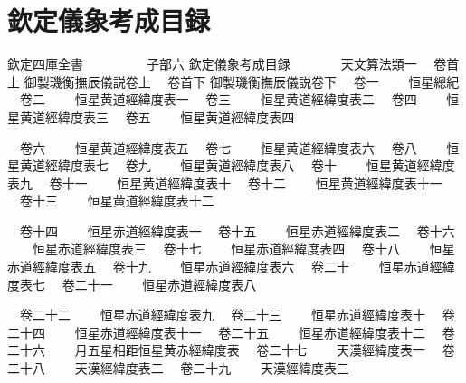 \chapter*{欽定儀象考成目録}
\begin{正文}
欽定四庫全書　　　　　子部六
欽定儀象考成目録　　　　天文算法類一
　卷首上
御製璣衡撫辰儀説卷上
　卷首下
御製璣衡撫辰儀説卷下
　卷一
　　恒星總紀
　卷二
　　恒星黄道經緯度表一
　卷三
　　恒星黄道經緯度表二
　卷四
　　恒星黄道經緯度表三
　卷五
　　恒星黄道經緯度表四
\par
　卷六
　　恒星黄道經緯度表五
　卷七
　　恒星黄道經緯度表六
　卷八
　　恒星黄道經緯度表七
　卷九
　　恒星黄道經緯度表八
　卷十
　　恒星黄道經緯度表九
　卷十一
　　恒星黄道經緯度表十
　卷十二
　　恒星黄道經緯度表十一
　卷十三
　　恒星黄道經緯度表十二
\par
　卷十四
　　恒星赤道經緯度表一
　卷十五
　　恒星赤道經緯度表二
　卷十六
　　恒星赤道經緯度表三
　卷十七
　　恒星赤道經緯度表四
　卷十八
　　恒星赤道經緯度表五
　卷十九
　　恒星赤道經緯度表六
　卷二十
　　恒星赤道經緯度表七
　卷二十一
　　恒星赤道經緯度表八
\par
　卷二十二
　　恒星赤道經緯度表九
　卷二十三
　　恒星赤道經緯度表十
　卷二十四
　　恒星赤道經緯度表十一
　卷二十五
　　恒星赤道經緯度表十二
　卷二十六
　　月五星相距恒星黄赤經緯度表
　卷二十七
　　天漢經緯度表一
　卷二十八
　　天漢經緯度表二
　卷二十九
　　天漢經緯度表三
\par

\par\end{正文}\clearpage
